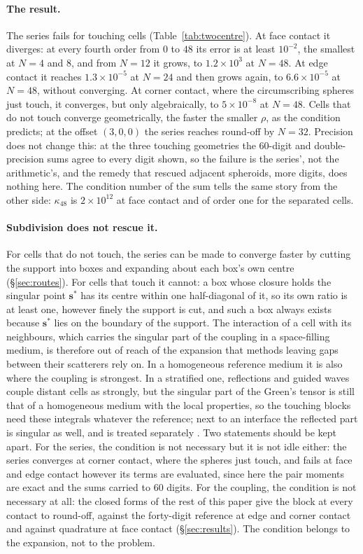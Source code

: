 \documentclass[11pt,a4paper]{article}
\newcommand{\bs}{\mathbf{s}}
\begin{document}
\paragraph{The result.} The series fails for touching cells (Table~\ref{tab:twocentre}). At face contact it
diverges: at every fourth order from $0$ to $48$ its error is at least $10^{-2}$, the smallest at $N=4$
and $8$, and from $N=12$ it grows, to $1.2\times10^{3}$ at $N=48$. At edge contact it reaches
$1.3\times10^{-5}$ at $N=24$ and then grows again, to $6.6\times10^{-5}$ at $N=48$, without converging. At corner contact, where
the circumscribing spheres just touch, it converges, but only algebraically, to $5\times10^{-8}$ at $N=48$.
Cells that do not touch converge geometrically, the faster the smaller $\rho$, as the condition predicts;
at the offset $(3,0,0)$ the series reaches round-off by $N=32$. Precision does not change this: at the three touching
geometries the $60$-digit and double-precision sums agree to every digit shown, so the failure is the
series', not the arithmetic's, and the remedy that rescued adjacent spheroids, more digits, does nothing
here. The condition number of the sum tells the same story from the other side: $\kappa_{48}$ is
$2\times10^{12}$ at face contact and of order one for the separated cells.

\paragraph{Subdivision does not rescue it.} For cells that do not touch, the series can be made to converge
faster by cutting the support into boxes and expanding about each box's own centre (\S\ref{sec:routes}).
For cells that touch it cannot: a box whose closure holds the singular point $\bs^*$ has its centre within
one half-diagonal of it, so its own ratio is at least one, however finely the support is cut, and such a box
always exists because $\bs^*$ lies on the boundary of the support. The interaction of a cell with its
neighbours, which carries the singular part of the coupling in a space-filling medium, is therefore out of
reach of the expansion that methods leaving gaps between their scatterers rely on. In a homogeneous
reference medium it is also where the coupling is strongest. In a stratified one, reflections and guided
waves couple distant cells as strongly, but the singular part of the Green's tensor is still that of a
homogeneous medium with the local properties, so the touching blocks need these integrals whatever the
reference; next to an interface the reflected part is singular as well, and is treated separately
\citep{NestorInterface2026}. Two statements
should be kept apart. For the series, the condition is not necessary but it is not idle either: the series
converges at corner contact, where the spheres just touch, and fails at face and edge contact however its
terms are evaluated, since here the pair moments are exact and the sums carried to $60$ digits. For the
coupling, the condition is not necessary at all: the closed forms of the rest of this paper give the
block at every contact to round-off, against the forty-digit reference at edge and corner contact and
against quadrature at face contact (\S\ref{sec:results}). The condition belongs to
the expansion, not to the problem.
\end{document}
